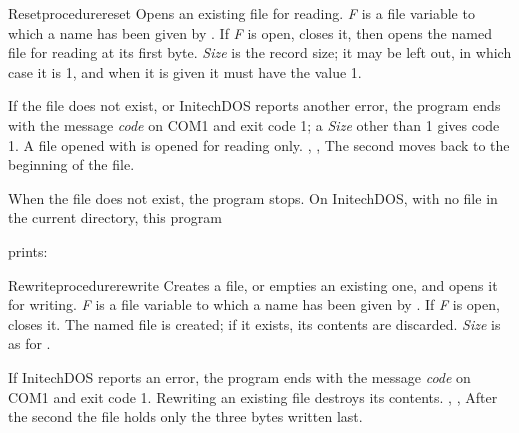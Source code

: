 \begin{LibEntry}{Reset}{procedure}{reset}
\LFunction Opens an existing file for reading.
\LDeclaration {}
\LRemarks \textit{F} is a file variable to which a name has been given by
.  If \textit{F} is open,  closes it,
then opens the named file for reading at its first byte.  \textit{Size} is
the record size; it may be left out, in which case it is 1, and when it is
given it must have the value 1.

If the file does not exist, or InitechDOS reports another error, the
program ends with the message \textit{code} on COM1
and exit code 1; a \textit{Size} other than 1 gives code 1.
\LRestrictions A file opened with  is opened for reading
only.
\LSeeAlso {}, ,
\LExample
{}
The second  moves back to the beginning of the file.

When the file does not exist, the program stops.  On InitechDOS, with no
file  in the current directory, this program


prints:

\end{LibEntry}

\begin{LibEntry}{Rewrite}{procedure}{rewrite}
\LFunction Creates a file, or empties an existing one, and opens it for
writing.
\LDeclaration {}
\LRemarks \textit{F} is a file variable to which a name has been given by
.  If \textit{F} is open,  closes it.
The named file is created; if it exists, its contents are discarded.
\textit{Size} is as for .

If InitechDOS reports an error, the program ends with the message
\textit{code} on COM1 and exit code 1.
\LArrow Rewriting an existing file destroys its contents.
\LSeeAlso {}, ,
\LExample
{}
After the second  the file holds only the three bytes
written last.
\end{LibEntry}

